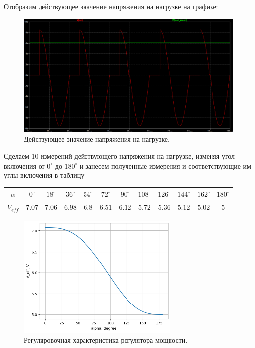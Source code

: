 \documentclass[12pt]{article}
\begin{document}
Отобразим действующее значение напряжения на нагрузке на графике:
\begin{figure}[H]
    \centering
    \includegraphics[width=\textwidth]{2_out_mean_v.png}
    \caption{Действующее значение напряжения на нагрузке.}
    \label{fig:2_out_mean_v}
\end{figure}

Сделаем 10 измерений действующего напряжения на нагрузке, изменяя угол включения от $0^\circ$ до $180^\circ$ и занесем полученные измерения и соответствующие им углы включения в таблицу:

\begin{center}
\begin{tabular}{ c|c c c c c c c c c c c } 
 $\alpha$ & $0^\circ$ & $18^\circ$ & $36^\circ$ & $54^\circ$ & $72^\circ$ & $90^\circ$ & $108^\circ$ & $126^\circ$ & $144^\circ$ & $162^\circ$ & $180^\circ$ \\ 
 \hline
 $V_{eff}$ & $7.07$ & $7.06$ & $6.98$ & $6.8$ & $6.51$ & $6.12$ & $5.72$ & $5.36$ & $5.12$ & $5.02$ & $5$ \\ 
\end{tabular}
\end{center}

\begin{figure}[H]
    \centering
    \includegraphics[width=0.7\textwidth]{v_eff_degree.png}
    \caption{Регулировочная характеристика регулятора мощности.}
    \label{fig:v_eff_degree}
\end{figure}
\end{document}
